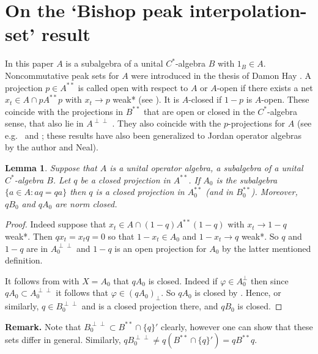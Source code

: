 \documentclass{amsart}
\newtheorem{lemma}[theorem]{Lemma}
\theoremstyle{remark}
\theoremstyle{definition}
\numberwithin{equation}{section}
\begin{document}
\section{On the  `Bishop peak interpolation-set' result}

In this paper $A$ is a subalgebra of a unital $C^*$-algebra $B$ with $1_B \in A$.   Noncommutative peak sets for $A$ 
were introduced in the thesis of Damon Hay \cite{Hay}.
 A projection $p \in A^{**}$ is called
open with respect to $A$ or $A$-open if   there exists a net $x_t \in A \cap p A^{**} p$ with $x_t \to p$ weak* (see  \cite[Section 2]{BHN}).
It is $A$-closed if $1-p$ is $A$-open.    These coincide with  the projections in $B^{**}$ that are open or closed in the $C^*$-algebra sense,
that also lie in $A^{\perp \perp}$ \cite[Theorem 2.4]{BHN}. They also coincide with the $p$-projections for $A$   (see e.g.\ \cite[Theorem 1.2]{BRI} and \cite[Theorem 3.4]{BNcp}; these results have also been generalized to Jordan operator algebras 
  by the author and Neal).  





\begin{lemma} \label{qinz} Suppose that $A$ is a unital operator algebra, 
a subalgebra of a unital $C^*$-algebra $B$.
 Let $q$ be a closed projection in $A^{**}$.  If $A_0$ is the subalgebra
 $\{ a \in A : aq = qa \}$ then $q$ is a closed projection in $A_0^{**}$
 (and in $B_0^{**}$). 
Moreover, $q B_0$ and $q A_0$ are norm closed.
\end{lemma}
\begin{proof}  
Indeed suppose that  $x_t \in A \cap (1-q) A^{**} (1-q)$ with $x_t \to 1-q$ weak*. 
  Then $q x_t = x_t q = 0$ so that $1-x_t \in A_0$ and $1-x_t \to q$ weak*.
So $q$ and $1-q$ are in $A_0^{\perp \perp}$ and $1-q$ is an open projection for $A_0$
by the latter mentioned definition.

It follows from 
\cite[Proposition 3.1]{Hay} with $X = A_0$ that $q A_0$ is closed.   Indeed if $\varphi \in A_0
^{\perp}$ 
then since $qA_0 \subset A_0^{\perp \perp}$ it follows that $\varphi \in (q A_0)_\perp$.   So $q A_0$ is closed by \cite[Proposition 3.1]{Hay}.  Hence, or similarly, $q \in B_0^{\perp \perp}$ and is a closed projection there, and  $q B_0$ is closed.
\end{proof}

 
{\bf Remark.} Note that $B_0^{\perp \perp} \subset B^{**} \cap \{ q \}'$ clearly, however one can show that these sets differ in general.   Similarly, $q B_0^{\perp \perp} \neq q(B^{**} \cap \{ q \}') = q B^{**}q$.
\end{document}
